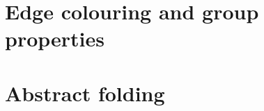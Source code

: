 \documentclass[11pt, handout]{beamer}
\begin{document}
            
\section{Edge colouring and group properties}
\frame{\tableofcontents[currentsection]}


\section{Abstract folding}
\frame{\tableofcontents[currentsection]}
\end{document}
